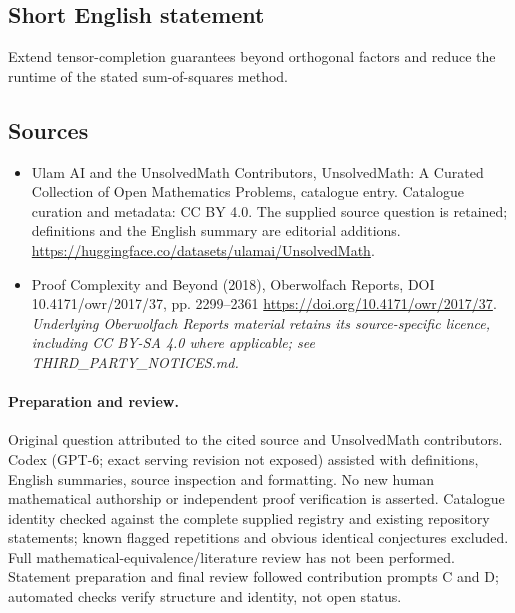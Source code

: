 \documentclass[11pt]{article}
\begin{document}
\subsection{Short English statement}
Extend tensor-completion guarantees beyond orthogonal factors and reduce the runtime of the stated sum-of-squares method.
\subsection{Sources}
\begin{itemize}
\item[\hypertarget{source:statement:1}{S1}] Ulam AI and the UnsolvedMath Contributors, UnsolvedMath: A Curated Collection of Open Mathematics Problems, catalogue entry. Catalogue curation and metadata: CC BY 4.0. The supplied source question is retained; definitions and the English summary are editorial additions.
\url{https://huggingface.co/datasets/ulamai/UnsolvedMath}.
\item[\hypertarget{source:statement:2}{S2}] Proof Complexity and Beyond (2018), Oberwolfach Reports, DOI 10.4171/owr/2017/37, pp. 2299--2361
\url{https://doi.org/10.4171/owr/2017/37}.
\textit{Underlying Oberwolfach Reports material retains its source-specific licence, including CC BY-SA 4.0 where applicable; see THIRD\_PARTY\_NOTICES.md.}
\end{itemize}
\paragraph{Preparation and review.}
Original question attributed to the cited source and UnsolvedMath contributors. Codex (GPT-6; exact serving revision not exposed) assisted with definitions, English summaries, source inspection and formatting. No new human mathematical authorship or independent proof verification is asserted. Catalogue identity checked against the complete supplied registry and existing repository statements; known flagged repetitions and obvious identical conjectures excluded. Full mathematical-equivalence/literature review has not been performed. Statement preparation and final review followed contribution prompts C and D; automated checks verify structure and identity, not open status.
\label{end:statement}
\end{document}
